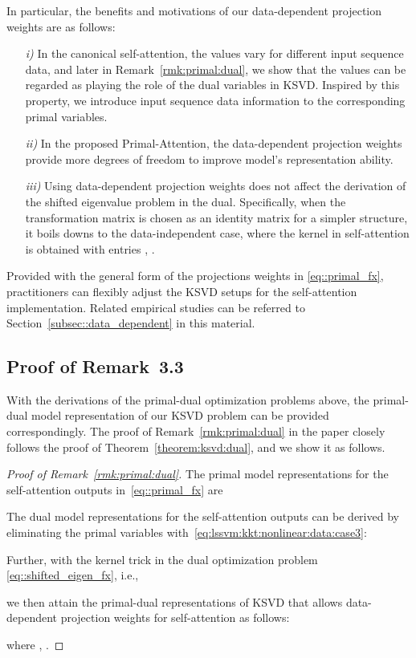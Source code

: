 \documentclass{article}
\begin{document}
In particular, the benefits and motivations of our data-dependent projection weights are as follows: 
\begin{itemize}
\item[\emph{i)}] In the canonical self-attention, the values vary for different input sequence data, and later in Remark~\ref{rmk:primal:dual}, we show that the values can be regarded as playing the role of the dual variables in KSVD. Inspired by this property, we introduce input sequence data information to the corresponding primal variables.

\item[\emph{ii)}] In the proposed Primal-Attention, the data-dependent projection weights provide more degrees of freedom to improve model's representation ability.

\item[\emph{iii)}] Using data-dependent projection weights does not affect the derivation of the shifted eigenvalue problem in the dual.
Specifically, when the transformation matrix  is chosen as an identity matrix for a simpler structure, it boils downs to the data-independent case, where the  kernel  in self-attention is obtained with entries , .
\end{itemize}
Provided with the general form of the projections weights in \eqref{eq::primal_fx}, practitioners can flexibly adjust the KSVD setups for the self-attention implementation.  
Related empirical studies can be referred to Section~\ref{subsec::data_dependent} in this material.



\subsection{Proof of Remark~3.3}
With the derivations of the primal-dual optimization problems above, the primal-dual model representation of our KSVD problem can be provided correspondingly.
The proof of Remark~\ref{rmk:primal:dual} in the paper closely follows the proof of Theorem~\ref{theorem:ksvd:dual}, and we show it as follows.
\begin{proof}[Proof of Remark~\ref{rmk:primal:dual}]
The primal model representations for the self-attention outputs
in~\eqref{eq::primal_fx} are

The dual model representations for the self-attention outputs can be derived by eliminating the primal variables with~\eqref{eq:lssvm:kkt:nonlinear:data:case3}:

Further, with the kernel trick in the dual optimization problem \eqref{eq::shifted_eigen_fx}, i.e.,

we then attain the primal-dual representations of KSVD that allows data-dependent projection weights for self-attention as follows:

where , .
\end{proof}
\end{document}
